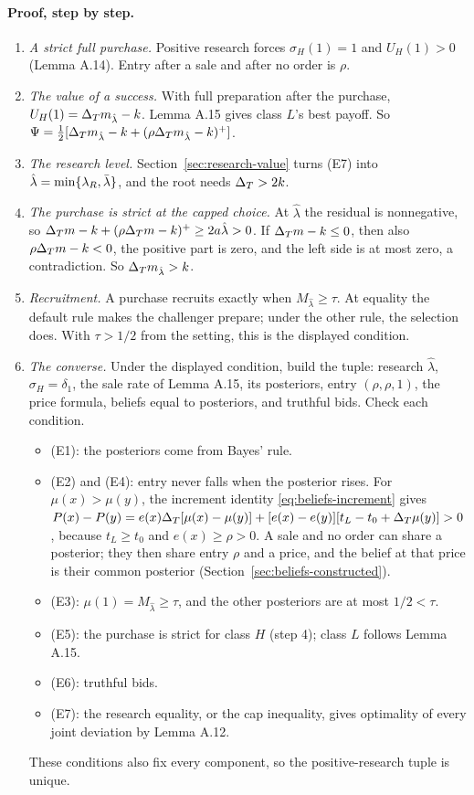 \paragraph{Proof, step by step.}
\begin{enumerate}
\item \emph{A strict full purchase.} Positive research forces \(\sigma_H(1)=1\) and \(U_H(1)>0\) (Lemma A.14). Entry
after a sale and after no order is \(\rho\).
\item \emph{The value of a success.} With full preparation after the purchase, \(U_H(1)=\Delta_T m_{\hat\lambda}-k\).
Lemma A.15 gives class \(L\)'s best payoff. So \(\Psi=\tfrac12[\Delta_T m_{\hat\lambda}-k+(\rho\Delta_T m_{\hat\lambda}-k)^+]\).
\item \emph{The research level.} Section~\ref{sec:research-value} turns (E7) into \(\hat\lambda=\min\{\lambda_R,\bar\lambda\}\),
and the root needs \(\Delta_T>2k\).
\item \emph{The purchase is strict at the capped choice.} At \(\hat\lambda\) the residual is nonnegative, so
\(\Delta_T m-k+(\rho\Delta_T m-k)^+\ge2a\hat\lambda>0\). If \(\Delta_T m-k\le0\), then also \(\rho\Delta_T m-k<0\), the positive part is
zero, and the left side is at most zero, a contradiction. So \(\Delta_T m_{\hat\lambda}>k\).
\item \emph{Recruitment.} A purchase recruits exactly when \(M_{\hat\lambda}\ge\tau\). At equality the default rule
makes the challenger prepare; under the other rule, the selection does. With \(\tau>1/2\) from the setting, this is the
displayed condition.
\item \emph{The converse.} Under the displayed condition, build the tuple: research \(\hat\lambda\), \(\sigma_H=\delta_1\),
the sale rate of Lemma A.15, its posteriors, entry \((\rho,\rho,1)\), the price formula, beliefs equal to posteriors,
and truthful bids. Check each condition.
\begin{itemize}
\item (E1): the posteriors come from Bayes' rule.
\item (E2) and (E4): entry never falls when the posterior rises. For \(\mu(x)>\mu(y)\), the increment identity
\eqref{eq:beliefs-increment} gives \(P(x)-P(y)=e(x)\Delta_T[\mu(x)-\mu(y)]+[e(x)-e(y)][t_L-t_0+\Delta_T\mu(y)]>0\), because
\(t_L\ge t_0\) and \(e(x)\ge\rho>0\). A sale and no order can share a posterior; they then share entry \(\rho\) and a
price, and the belief at that price is their common posterior (Section~\ref{sec:beliefs-constructed}).
\item (E3): \(\mu(1)=M_{\hat\lambda}\ge\tau\), and the other posteriors are at most \(1/2<\tau\).
\item (E5): the purchase is strict for class \(H\) (step 4); class \(L\) follows Lemma A.15.
\item (E6): truthful bids.
\item (E7): the research equality, or the cap inequality, gives optimality of every joint deviation by Lemma A.12.
\end{itemize}
These conditions also fix every component, so the positive-research tuple is unique.
\end{enumerate}

